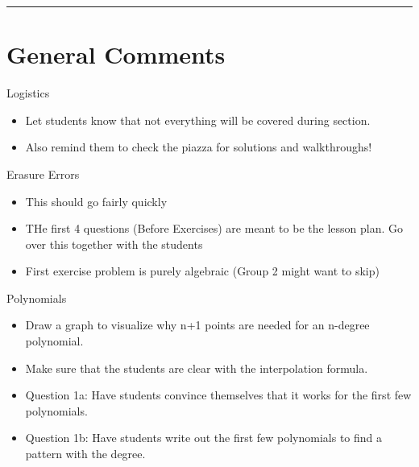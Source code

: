 \documentclass{exam}
\title{}
\date{Polynomials, Secret Sharing, Erasure Errors, General Errors, Self Reference}
\begin{document}
\maketitle
\rule{\textwidth}{0.15em}
\fontsize{12}{15}\selectfont
\thispagestyle{empty}


\section{General Comments}
\begin{questions}
\item Logistics
\begin{itemize}
\item Let students know that not everything will be covered during section. 
\item Also remind them to check the piazza for solutions and walkthroughs!
\end{itemize}
\item Erasure Errors
\begin{itemize}
\item This should go fairly quickly
\item THe first 4 questions (Before Exercises) are meant to be the lesson plan. Go over this together with the students
\item First exercise problem is purely algebraic (Group 2 might want to skip)
\end{itemize}

\item Polynomials
\begin{itemize}
\item Draw a graph to visualize why n+1 points are needed for an n-degree polynomial.
\item Make sure that the students are clear with the interpolation formula.
\item Question 1a: Have students convince themselves that it works for the first few polynomials.
\item Question 1b: Have students write out the first few polynomials to find a pattern with the degree.


\end{itemize}
\end{questions}
\end{document}
